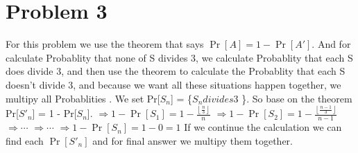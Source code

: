 \documentclass[12pt]{article}
\begin{document}
\section*{Problem 3}
For this problem we use the theorem that says $ \Pr[A] = 1 - \Pr[A'] $.
And for calculate Probablity that none of S divides 3,
we calculate Probablity that each S does divide 3,
and then use the theorem to calculate the Probablity that each S doesn't divide 3,
and because we want all these situations happen together, we multipy all Probablities .
\newline We set Pr[$S_{n}$] = \{$S_{n} divides 3$ \}.
\newline So base on the theorem Pr[$S'_{n}$] = 1 - Pr[$S_{n}$].
\newline\newline $\Rightarrow 1 - \Pr[S_{1}] = 1 - \frac{\left\lfloor \frac{n}{3} \right\rfloor}{n}$
\newline $\Rightarrow 1 - \Pr[S_{2}] = 1 - \frac{\left\lfloor \frac{n - 1}{3} \right\rfloor}{n - 1}$
\newline $\Rightarrow \cdots$
\newline $\Rightarrow \cdots$
\newline $\Rightarrow 1 - \Pr[S_{n}] = 1 - 0 = 1$
\newline \newline If we continue the calculation we can find each $\Pr[S'_{n}]$
and for final answer we multipy them together.
\end{document}
